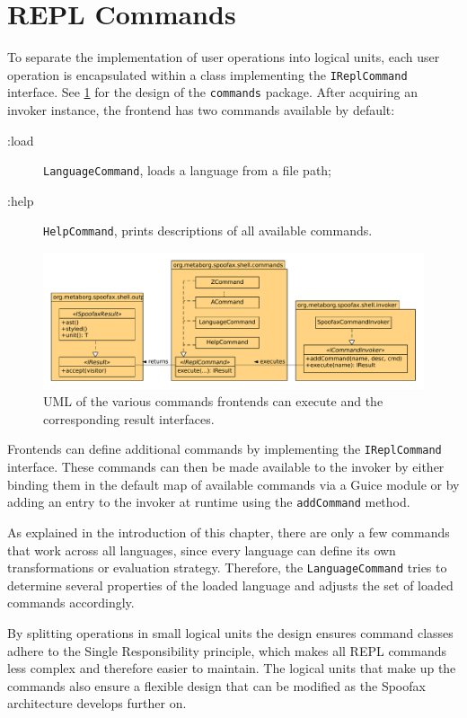 \section{REPL Commands}
\label{sec:commands}

To separate the implementation of user operations into logical units, each user
operation is encapsulated within a class implementing the
\texttt{IReplCommand} interface. See \cref{fig:uml-commands} for the design
of the \texttt{commands} package. After acquiring an invoker instance, the
frontend has two commands available by default:

\begin{description}
  \item [:load] \texttt{LanguageCommand}, loads a language from a file path;
  \item [:help] \texttt{HelpCommand}, prints descriptions of all available commands.
\end{description}

\begin{figure}[h]
  \centering
  \includegraphics[width=\textwidth]{uml-commands}
  \caption{UML of the various commands frontends can execute and the
           corresponding result interfaces.}
  \label{fig:uml-commands}
\end{figure}

Frontends can define additional commands by implementing the
\texttt{IReplCommand} interface. These commands can then be made available
to the invoker by either binding them in the default map of available commands
via a Guice module or by adding an entry to the invoker at runtime using the
\texttt{addCommand} method.

As explained in the introduction of this chapter, there are only a few
commands that work across all languages, since every language can define its
own transformations or evaluation strategy. Therefore, the
\texttt{LanguageCommand} tries to determine several properties of the loaded
language and adjusts the set of loaded commands accordingly.

By splitting operations in small logical units the design ensures command
classes adhere to the Single Responsibility principle, which makes all REPL
commands less complex and therefore easier to maintain. The logical units that
make up the commands also ensure a flexible design that can be modified
as the Spoofax architecture develops further on.


